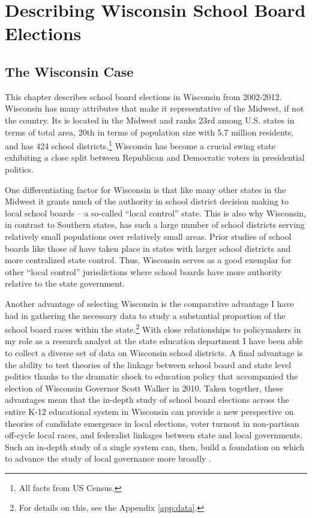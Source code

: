 \chapter{Describing Wisconsin School Board Elections}
\label{chap:wisco}




\section{The Wisconsin Case}

This chapter describes school board elections in Wisconsin from 2002-2012. 
Wisconsin has many attributes that make it representative of the Midwest, if not 
the country. Its is located in the Midwest and ranks 23rd among U.S. states in 
terms of total area, 20th in terms of population size with 5.7 million residents, 
and has 424 school districts.\footnote{All facts from US Census.} Wisconsin has 
become a crucial swing state exhibiting a close split between Republican and 
Democratic voters in presidential politics. 

One differentiating factor for Wisconsin is that like many other states in the 
Midwest it grants much of the authority in school district decision making to 
local school boards -- a so-called ``local control'' state. This is also why 
Wisconsin, in contrast to Southern states, has such a large number of 
school districts serving relatively small populations over relatively small areas. 
Prior studies of school boards like those of \citet{RefWorks:311,RefWorks:214} have 
taken place in states with larger school districts and more centralized state 
control. Thus, Wisconsin serves as a good exemplar for other ``local control'' 
jurisdictions where school boards have more authority relative to the state 
government. 

Another advantage of selecting Wisconsin is the comparative advantage
I have had in gathering the necessary data to study a substantial proportion of the 
school board races within the state.\footnote{For details on this, see the 
Appendix \ref{app:data}.} With close relationships to policymakers in my role 
as a research analyst at the state education department I have been able to 
collect a diverse set of 
data on Wisconsin school districts. A final advantage is the ability 
to test theories of the linkage between school board and state level politics thanks 
to the dramatic shock to education policy that accompanied the election of Wisconsin 
Governor Scott Walker in 2010. Taken together, these advantages mean that the in-depth 
study of school board elections across the entire K-12 educational system in Wisconsin 
can provide a new perspective on theories of candidate emergence in local elections, 
voter turnout in non-partisan off-cycle local races, and federalist linkages between 
state and local governments. Such an in-depth study of a single system can, then, 
build a foundation on which to advance the study of local governance more broadly 
\citep{RefWorks:192}. 

